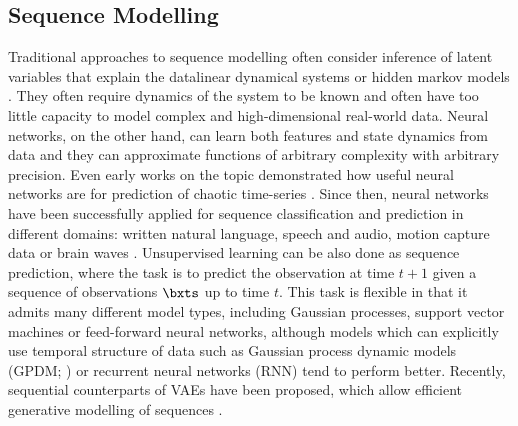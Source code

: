     \subsection{Sequence Modelling}
        Traditional approaches to sequence modelling often consider inference of latent variables that explain the data\eg linear dynamical systems or hidden markov models \citep{Bishop2006}.
        They often require dynamics of the system to be known and often have too little capacity to model complex and high-dimensional real-world data.
        Neural networks, on the other hand, can learn both features and state dynamics from data and they can approximate functions of arbitrary complexity with arbitrary precision.
        Even early works on the topic demonstrated how useful neural networks are for prediction of chaotic time-series \citep{Lapedes1988}.
        Since then, neural networks have been successfully applied for sequence classification and prediction in different domains: written natural language, speech and audio, motion capture data or brain waves \citep{Langkvist2014}. 
%
%
        Unsupervised learning can be also done as sequence prediction, where the task is to predict the observation at time $t+1$ given a sequence of observations $\bxts$ up to time $t$. This task is flexible in that it admits many different model types, including Gaussian processes, support vector machines or feed-forward neural networks, although models which can explicitly use temporal structure of data such as Gaussian process dynamic models (GPDM; \cite{Wang2008}) or recurrent neural networks (RNN) tend to perform better. Recently, sequential counterparts of VAEs have been proposed, which allow efficient generative modelling of sequences \citep{Fabius2015,Bayer2015,Karl2017}.
%
%
